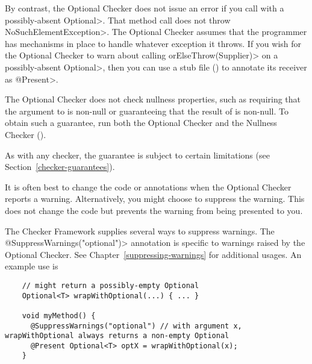 By contrast, the Optional Checker does not issue an error if you call
with a possibly-absent \<Optional>.  That method call does not
throw \<NoSuchElementException>.  The Optional Checker assumes that the
programmer has mechanisms in place to handle whatever exception it throws.
If you wish for the Optional Checker to warn about calling
\<orElseThrow(Supplier)> on a possibly-absent \<Optional>, then you can use
a stub file () to annotate its receiver as \<@Present>.

The Optional Checker does not check nullness properties, such as requiring
that the argument to
is non-null or guaranteeing that the result of
is non-null.  To obtain such a guarantee, run both the Optional Checker and
the Nullness Checker ().

As with any checker, the guarantee is subject to certain limitations (see
Section~\ref{checker-guarantees}).


It is often best to change the code or annotations when the Optional Checker
reports a warning.
Alternatively, you might choose to suppress the warning.
This does not change the code but prevents the warning from being presented to
you.

\begin{sloppypar}
The Checker Framework supplies several ways to suppress warnings.
The \<@SuppressWarnings("optional")> annotation is specific to warnings raised
by the Optional Checker.
See Chapter~\ref{suppressing-warnings} for additional usages.
An example use is
\end{sloppypar}

\begin{smaller}
\begin{Verbatim}
    // might return a possibly-empty Optional
    Optional<T> wrapWithOptional(...) { ... }

    void myMethod() {
      @SuppressWarnings("optional") // with argument x, wrapWithOptional always returns a non-empty Optional
      @Present Optional<T> optX = wrapWithOptional(x);
    }
\end{Verbatim}
\end{smaller}

